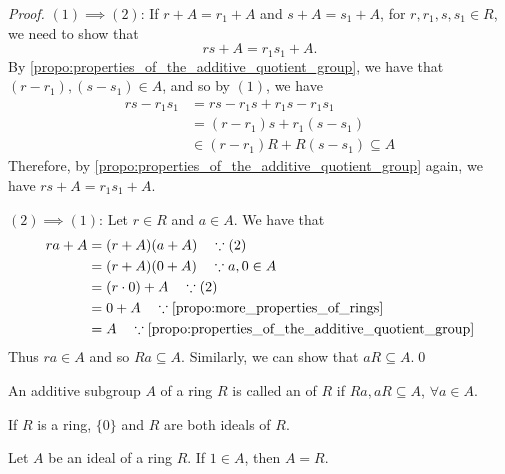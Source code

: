 \begin{proof}
  $(1) \implies (2)$: If $r + A = r_1 + A$ and $s + A = s_1 + A$, for $r, r_1, s, s_1 \in R$, we need to show that
  \begin{equation*}
    rs + A = r_1 s_1 + A.
  \end{equation*}
  By \cref{propo:properties_of_the_additive_quotient_group}, we have that $(r - r_1), (s - s_1) \in A$, and so by $(1)$, we have
  \begin{align*}
    rs - r_1 s_1 &= rs - r_1 s + r_1 s - r_1 s_1 \\
                 &= (r - r_1)s + r_1 (s - s_1) \\
                 &\in (r - r_1) R + R (s - s_1) \subseteq A
  \end{align*}
  Therefore, by \cref{propo:properties_of_the_additive_quotient_group} again, we have $rs + A = r_1 s_1 + A$.

  \noindent $(2) \implies (1)$: Let $r \in R$ and $a \in A$. We have that
  \begin{align*}
    ra + A &= (r + A)(a + A) \quad \because (2) \\
           &= (r + A)(0 + A) \quad \because a, 0 \in A \\
           &= ( r \cdot 0 ) + A \quad \because (2) \\
           &= 0 + A \quad \because \cref{propo:more_properties_of_rings} \\
           &= A \quad \because \cref{propo:properties_of_the_additive_quotient_group}
  \end{align*}
  Thus $ra \in A$ and so $Ra \subseteq A$. Similarly, we can show that $aR \subseteq A$.\qed
\end{proof}

\begin{defn}[Ideal]
\label{defn:ideal}
  An additive subgroup $A$ of a ring $R$ is called an  of $R$ if $Ra, aR \subseteq A$, $\forall a \in A$.
\end{defn}

\begin{eg}
  If $R$ is a ring, $\{0\}$ and $R$ are both ideals of $R$.
\end{eg}

\begin{propo}
\label{propo:the_only_ideal_with_the_multiplicative_identity_is_the_ring_itself}
Let $A$ be an ideal of a ring $R$. If $1 \in A$, then $A = R$.
\end{propo}

